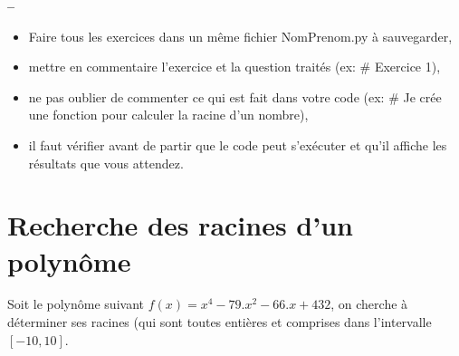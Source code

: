 


\usepackage{enumitem}







\begin{center}
{\Large\bf {\type} \no {\numero} -- \descrip}
\end{center}


\begin{boxedminipage}{.9\textwidth} 
\begin{itemize}
 \item Faire tous les exercices dans un même fichier {NomPrenom.py} à sauvegarder,
 \item mettre en commentaire l'exercice et la question traités (ex: \# Exercice 1),
 \item ne pas oublier de commenter ce qui est fait dans votre code (ex: \# Je crée une fonction pour calculer la racine d'un nombre),
 \item il faut vérifier avant de partir que le code peut s'exécuter et qu'il affiche les résultats que vous attendez.
\end{itemize}
\end{boxedminipage}

\section*{Recherche des racines d'un polynôme}

Soit le polynôme suivant $f(x)=x^4-79.x^2-66.x+432$, on cherche à déterminer ses racines (qui sont toutes entières et comprises dans l'intervalle $\left[-10,10\right]$.

